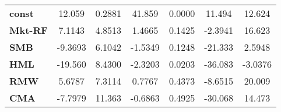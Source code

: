 \begin{center}
\begin{tabular}{lcccccc}
\midrule
\textbf{const}  &       12.059       &       0.2881       &      41.859     &      0.0000      &       11.494      &       12.624       \\
\textbf{Mkt-RF} &       7.1143       &       4.8513       &      1.4665     &      0.1425      &      -2.3941      &       16.623       \\
\textbf{SMB}    &      -9.3693       &       6.1042       &     -1.5349     &      0.1248      &      -21.333      &       2.5948       \\
\textbf{HML}    &      -19.560       &       8.4300       &     -2.3203     &      0.0203      &      -36.083      &      -3.0376       \\
\textbf{RMW}    &       5.6787       &       7.3114       &      0.7767     &      0.4373      &      -8.6515      &       20.009       \\
\textbf{CMA}    &      -7.7979       &       11.363       &     -0.6863     &      0.4925      &      -30.068      &       14.473       \\
\bottomrule
\end{tabular}
\end{center}
